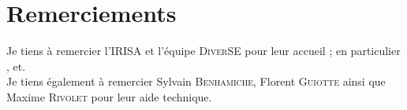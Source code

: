 \section*{Remerciements}

\begin{flushright}
Je tiens à remercier l'\textsc{IRISA} et l'équipe \textsc{DiverSE} pour leur accueil ; en particulier \johann, \paco et\linebreak  \inti.\\ Je tiens également à remercier Sylvain \textsc{Benhamiche}, Florent \textsc{Guiotte} ainsi que Maxime \textsc{Rivolet} pour leur aide technique.
\end{flushright}
